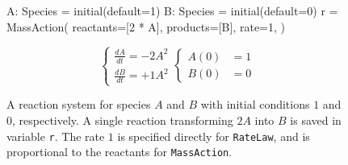 \documentclass[namedate,numsec,webpdf,modern,large]{oup-authoring-template}
\theoremstyle{thmstyleone}%
\theoremstyle{thmstyletwo}%
\theoremstyle{thmstylethree}%
\newenvironment{CodeInput}{\begin{tcolorbox}[title=input,boxrule=0pt]}{\end{tcolorbox}}
\newcommand{\KeywordTok}[1]{\textcolor[rgb]{0.00,0.13,1.00}{#1}}
\newcommand{\ClassTok}[1]{\textcolor[rgb]{0.27,0.56,0.65}{#1}}
\newcommand{\OperatorTok}[1]{\textcolor[rgb]{0.00,0.00,0.00}{#1}}
\newcommand{\VariableTok}[1]{\textcolor[rgb]{0.00,0.06,0.50}{#1}}
\newcommand{\ValueTok}[1]{\textcolor[rgb]{0.13,0.57,0.41}{#1}}
\newcommand{\FunctionTok}[1]{\textcolor[rgb]{0.47,0.37,0.15}{#1}}
\newcommand{\NormalTok}[1]{\textcolor[rgb]{0.00,0.06,0.50}{#1}}
\begin{document}
\begin{figure}[t]
\begin{minipage}[t]{\linewidth}
\begin{minipage}[c]{0.60\linewidth}
\begin{CodeInput}
\begin{Highlighting}[]
          \VariableTok{    A}: \ClassTok{Species }\OperatorTok{=}\FunctionTok{ initial}\KeywordTok{(}\VariableTok{default}\OperatorTok{=}\ValueTok{1}\KeywordTok{)}
          \VariableTok{    B}: \ClassTok{Species }\OperatorTok{=}\FunctionTok{ initial}\KeywordTok{(}\VariableTok{default}\OperatorTok{=}\ValueTok{0}\KeywordTok{)}
          \VariableTok{    r }\OperatorTok{=}\ClassTok{ MassAction}\KeywordTok{(}
          \VariableTok{        reactants}\OperatorTok{=}\KeywordTok{[}\ValueTok{2} \OperatorTok{*}\VariableTok{ A}\KeywordTok{]},
          \VariableTok{        products}\OperatorTok{=}\NormalTok{\KeywordTok{[}B\KeywordTok{]},}
          \VariableTok{        rate}\OperatorTok{=}\ValueTok{1}\NormalTok{,}
          \KeywordTok{    )}
          \end{Highlighting}
          \end{CodeInput}
      \end{minipage}%
      \begin{minipage}[c]{0.40\linewidth}
          \centering 
          \[
          \begin{cases}
              \frac{dA}{dt} = -2 A^2 \\
              \frac{dB}{dt} = +1 A^2
          \end{cases}
          \begin{cases}
              A(0) &= 1 \\
              B(0) &= 0
          \end{cases}
          \]
      \end{minipage}%
  \end{minipage}%
  
  \caption{
    A reaction system for species \(A\) and \(B\)
    with initial conditions \(1\) and \(0\), respectively. A single reaction
    transforming \(2A\) into \(B\) is saved in variable \texttt{r}. The rate
    \(1\) is specified directly for \texttt{RateLaw}, and is proportional to
    the reactants for \texttt{MassAction}.
  }
  \label{fig-simbio}
\end{figure}
\end{document}
